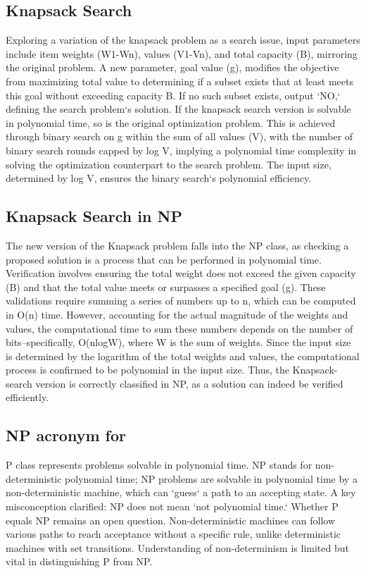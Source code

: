 \subsection*{Knapsack  Search}
Exploring a variation of the knapsack problem as a search issue, input parameters include item weights (W1-Wn), values (V1-Vn), and total capacity (B), mirroring the original problem.
A new parameter, goal value (g), modifies the objective from maximizing total value to determining if a subset exists that at least meets this goal without exceeding capacity B\@.
If no such subset exists, output `NO,` defining the search problem`s solution.
If the knapsack search version is solvable in polynomial time, so is the original optimization problem.
This is achieved through binary search on g within the sum of all values (V), with the number of binary search rounds capped by log V, implying a polynomial time complexity in solving the optimization counterpart to the search problem.
The input size, determined by log V, ensures the binary search`s polynomial efficiency.

\subsection*{Knapsack Search in NP}
The new version of the Knapsack problem falls into the NP class, as checking a proposed solution is a process that can be performed in polynomial time.
Verification involves ensuring the total weight does not exceed the given capacity (B) and that the total value meets or surpasses a specified goal (g).
These validations require summing a series of numbers up to n, which can be computed in O(n) time.
However, accounting for the actual magnitude of the weights and values, the computational time to sum these numbers depends on the number of bits--specifically, O(nlogW), where W is the sum of weights.
Since the input size is determined by the logarithm of the total weights and values, the computational process is confirmed to be polynomial in the input size.
Thus, the Knapsack-search version is correctly classified in NP, as a solution can indeed be verified efficiently.

\subsection*{NP acronym for}
P class represents problems solvable in polynomial time.
NP stands for non-deterministic polynomial time; NP problems are solvable in polynomial time by a non-deterministic machine, which can `guess` a path to an accepting state.
A key misconception clarified: NP does not mean `not polynomial time.` Whether P equals NP remains an open question.
Non-deterministic machines can follow various paths to reach acceptance without a specific rule, unlike deterministic machines with set transitions.
Understanding of non-determinism is limited but vital in distinguishing P from NP\@.

